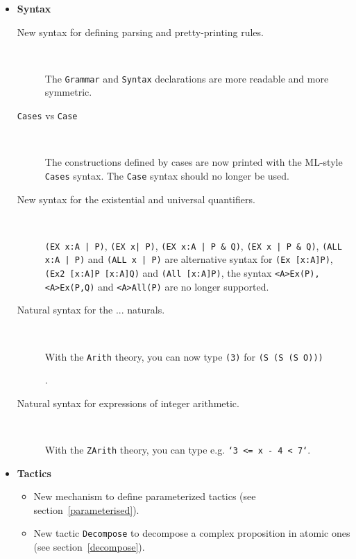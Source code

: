 \documentclass[11pt]{article}
\begin{document}
\begin{itemize}

\item \textbf{Syntax}

\begin{description}

  \item[New syntax for defining parsing and pretty-printing rules.]{\ 

  The \texttt{Grammar} and
    \texttt{Syntax} declarations are more readable and more symmetric.}

  \item[\texttt{Cases} vs \texttt{Case}]{\ 

   The constructions defined by cases are
    now printed with the ML-style \texttt{Cases} syntax. The
    \texttt{Case} syntax should no longer be used.}

  \item[New syntax for the existential and universal quantifiers.]{\ 

   \texttt{(EX x:A | P)}, \texttt{(EX x| P)}, \texttt{(EX x:A | P \&
   Q)}, \texttt{(EX x | P \& Q)},
   \texttt{(ALL x:A | P)} and 
   \texttt{(ALL x | P)} are alternative
    syntax for \texttt{(Ex [x:A]P)},  \texttt{(Ex2 [x:A]P [x:A]Q)}
    and  \texttt{(All [x:A]P)}, the syntax \texttt{<A>Ex(P),
    <A>Ex(P,Q)} and \texttt{<A>All(P)} are no longer supported.}

  \item[Natural syntax for the ... naturals.]{\ 

   With the {\tt Arith} theory, you can
    now type \texttt{(3)} for \texttt{(S (S (S O)))}}.

  \item[Natural syntax for expressions of integer arithmetic.]{\ 

   With the {\tt ZArith} theory, you can
    type e.g. \texttt{`3 <= x - 4 < 7`}.}
  
\end{description}

\item \textbf{Tactics}

  \begin{itemize}

  \item New mechanism to define parameterized tactics (see
  section~\ref{parameterised}).

  \item New tactic \texttt{Decompose} to decompose a
  complex proposition in atomic ones (see
  section~\ref{decompose}).


\end{itemize}
\end{itemize}
\end{document}
